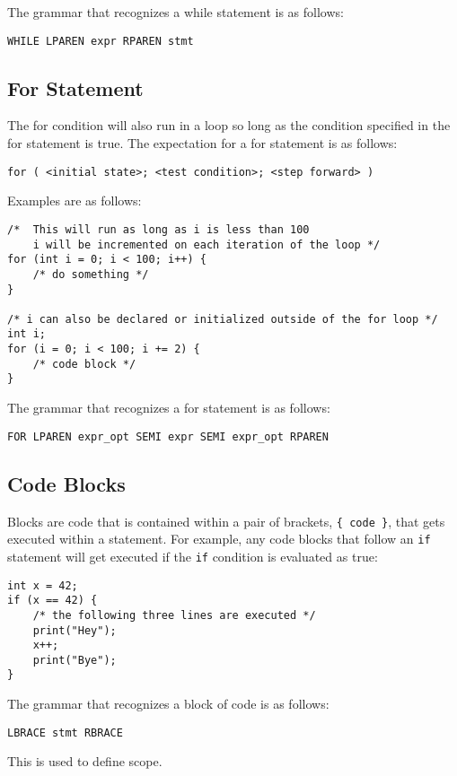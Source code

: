 \documentclass{article}
\begin{document}
The grammar that recognizes a while statement is as follows:
\begin{Verbatim}[frame=single]
WHILE LPAREN expr RPAREN stmt
\end{Verbatim}

\subsection{For Statement}
The for condition will also run in a loop so long as the condition specified in the for statement is true.  The expectation for a for statement is as follows:

\texttt{for ( <initial state>; <test condition>; <step forward> )}

Examples are as follows:

\begin{lstlisting}
/* 	This will run as long as i is less than 100
	i will be incremented on each iteration of the loop */
for (int i = 0; i < 100; i++) {
	/* do something */
}

/* i can also be declared or initialized outside of the for loop */
int i;
for (i = 0; i < 100; i += 2) {
	/* code block */
}
\end{lstlisting}

The grammar that recognizes a for statement is as follows:
\begin{Verbatim}[frame=single]
FOR LPAREN expr_opt SEMI expr SEMI expr_opt RPAREN
\end{Verbatim}

\subsection{Code Blocks}
Blocks are code that is contained within a pair of brackets, \texttt{\{ code \}}, that gets executed within a statement.  For example, any code blocks that follow an \texttt{if} statement will get executed if the \texttt{if} condition is evaluated as true:

\begin{lstlisting}
int x = 42;
if (x == 42) {
	/* the following three lines are executed */
	print("Hey");
	x++;
	print("Bye");
}
\end{lstlisting}

The grammar that recognizes a block of code is as follows:
\begin{Verbatim}[frame=single]
LBRACE stmt RBRACE
\end{Verbatim}

This is used to define scope. 
\end{document}
